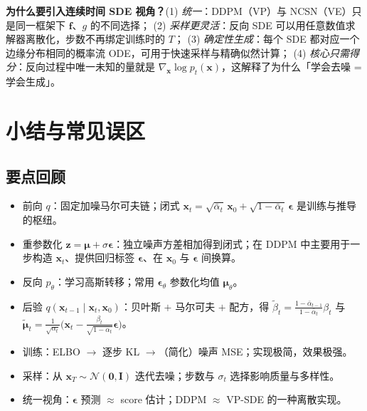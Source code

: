 \documentclass[a4paper,fontset=none,zihao=5]{ctexart}
\numberwithin{equation}{section}
\newcommand{\x}{\mathbf{x}}
\newcommand{\I}{\mathbf{I}}
\newcommand{\N}{\mathcal{N}}
\newcommand{\abar}{\bar{\alpha}}
\newcommand{\eps}{\boldsymbol{\epsilon}}
\newcommand{\epst}{\boldsymbol{\epsilon}_\theta}
\newcommand{\mut}{\tilde{\boldsymbol{\mu}}}
\newcommand{\mutheta}{\boldsymbol{\mu}_\theta}
\newcommand{\btil}{\tilde{\beta}}
\begin{document}
\begin{whybox}
\textbf{为什么要引入连续时间 SDE 视角？}(1) \emph{统一}：DDPM（VP）与 NCSN（VE）只是同一框架下 $\mathbf{f}$、$g$ 的不同选择；
(2) \emph{采样更灵活}：反向 SDE 可以用任意数值求解器离散化，步数不再绑定训练时的 $T$；
(3) \emph{确定性生成}：每个 SDE 都对应一个边缘分布相同的概率流 ODE，可用于快速采样与精确似然计算；
(4) \emph{核心只需得分}：反向过程中唯一未知的量就是 $\nabla_{\x}\log p_t(\x)$，这解释了为什么「学会去噪 = 学会生成」。
\end{whybox}

\newpage
\section{小结与常见误区}

\subsection{要点回顾}
\begin{itemize}[leftmargin=1.6em,itemsep=2pt]
  \item 前向 $q$：固定加噪马尔可夫链；闭式 $\x_t=\sqrt{\abar_t}\,\x_0+\sqrt{1-\abar_t}\,\eps$ 是训练与推导的枢纽。
  \item 重参数化 $\mathbf{z}=\boldsymbol{\mu}+\sigma\eps$：独立噪声方差相加得到闭式；在 DDPM 中主要用于一步构造 $\x_t$、提供回归标签 $\eps$、在 $\x_0$ 与 $\eps$ 间换算。
  \item 反向 $p_\theta$：学习高斯转移；常用 $\epst$ 参数化均值 $\mutheta$。
  \item 后验 $q(\x_{t-1}\mid\x_t,\x_0)$：贝叶斯 $+$ 马尔可夫 $+$ 配方，得 $\btil_t=\frac{1-\abar_{t-1}}{1-\abar_t}\beta_t$ 与 $\mut_t=\frac{1}{\sqrt{\alpha_t}}\big(\x_t-\frac{\beta_t}{\sqrt{1-\abar_t}}\eps\big)$。
  \item 训练：ELBO $\to$ 逐步 KL $\to$（简化）噪声 MSE；实现极简，效果极强。
  \item 采样：从 $\x_T\sim\N(\mathbf{0},\I)$ 迭代去噪；步数与 $\sigma_t$ 选择影响质量与多样性。
  \item 统一视角：$\eps$ 预测 $\approx$ score 估计；DDPM $\approx$ VP-SDE 的一种离散实现。
\end{itemize}
\end{document}
